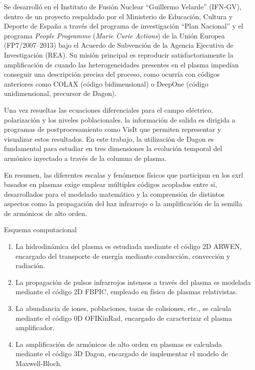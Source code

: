 \begin{itemize}
      Se desarrolló en el Instituto de Fusión Nuclear \enquote{Guillermo Velarde} (IFN-GV)\autocite{Oliva2017}, dentro de un proyecto respaldado por el Ministerio de Educación, Cultura y Deporte de España a través del programa de investigación \enquote{Plan Nacional} y el programa \emph{People Programme} (\emph{Marie Curie Actions}) de la Unión Europea (FP7/\numrange{2007}{2013}) bajo el Acuerdo de Subvención de la Agencia Ejecutiva de Investigación (REA). Su misión principal es reproducir satisfactoriamente la amplificación de  cuando las heterogeneidades presentes en el plasma impedían conseguir una descripción precisa del proceso, como ocurría con códigos anteriores como COLAX (código bidimensional)\autocite{Larroche2000,Almiev2007} o DeepOne (código unidimensional, precursor de Dagon)\autocite{Oliva2011}.

      Una vez resueltas las ecuaciones diferenciales para el campo eléctrico, polarización y los niveles poblacionales, la información de salida es dirigida a programas de postprocesamiento como VisIt que permiten representar y visualizar estos resultados. En este trabajo, la utilización de Dagon es fundamental para estudiar en tres dimensiones la evolución temporal del armónico inyectado a través de la columna de plasma.

\end{itemize}

En resumen, las diferentes escalas y fenómenos físicos que participan en los \acrshort{sxrl} basados en plasmas exige emplear múltiples códigos acoplados entre sí, desarrollados para el modelado matemático y la comprensión de distintos aspectos como la propagación del haz infrarrojo o la amplificación de la semilla de armónicos de alto orden.

\begin{footheorem*}{Esquema computacional}

  \begin{enumerate}

        \item La hidrodinámica del plasma es estudiada mediante el código 2D ARWEN, encargado del transporte de energía mediante conducción, convección y radiación.
        \item La propagación de pulsos infrarrojos intensos a través del plasma es modelada mediante el código 2D FBPIC, empleado en física de plasmas relativistas.
        \item La abundancia de iones, poblaciones, tasas de colisiones, etc., se calcula mediante el código 0D OFIKinRad, encargado de caracterizar el plasma amplificador.
        \item La amplificación de armónicos de alto orden en plasmas es calculada mediante el código 3D Dagon, encargado de implementar el modelo de Maxwell-Bloch.

  \end{enumerate}

\end{footheorem*}

